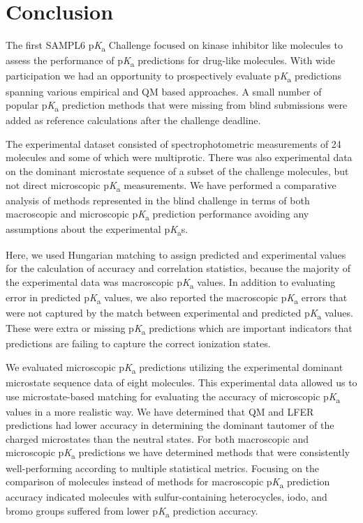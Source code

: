 \documentclass[9pt,lineno,final]{elife}
\newcommand{\pKa}{p\textit{K}\textsubscript{a}}
\begin{document}
\section{Conclusion}

The first SAMPL6 \pKa{} Challenge focused on kinase inhibitor like molecules to assess the performance of \pKa{} predictions for drug-like molecules. With wide participation we had an opportunity to prospectively evaluate \pKa{} predictions spanning various empirical and QM based approaches. A small number of popular \pKa{} prediction methods that were missing from blind submissions were added as reference calculations after the challenge deadline. 

The experimental dataset consisted of spectrophotometric measurements of 24 molecules and some of which were multiprotic. There was also experimental data on the dominant microstate sequence of a  subset of the challenge molecules, but not direct microscopic \pKa{} measurements. We have performed a comparative analysis of methods represented in the blind challenge in terms of both macroscopic and microscopic \pKa{} prediction performance avoiding any assumptions about the experimental \pKa{}s. 

Here, we used Hungarian matching to assign predicted and experimental values for the calculation of accuracy and correlation statistics, because the majority of the experimental data was macroscopic \pKa{} values. In addition to evaluating error in predicted \pKa{} values, we also reported the macroscopic \pKa{} errors that were not captured by the match between experimental and predicted \pKa{} values. These were extra or missing \pKa{} predictions which are important indicators that predictions are failing to capture the correct ionization states. 

We evaluated microscopic \pKa{} predictions utilizing the experimental dominant microstate sequence data of eight molecules. This experimental data allowed us to use microstate-based matching for evaluating the accuracy of microscopic \pKa{} values in a more realistic way. We have determined that QM and LFER predictions had lower accuracy in determining the dominant tautomer of the charged microstates than the neutral states. For both macroscopic and microscopic \pKa{} predictions we have determined methods that were consistently well-performing according to multiple statistical metrics. Focusing on the comparison of molecules instead of methods for macroscopic \pKa{} prediction accuracy indicated molecules with sulfur-containing heterocycles, iodo, and bromo groups suffered from lower \pKa{} prediction accuracy. 
\end{document}
